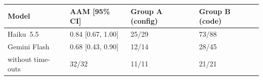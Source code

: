 \begin{tabular}{llll}
\toprule
Model & AAM [95\% CI] & Group A (config) & Group B (code) \\
\midrule
Haiku~5.5 & 0.84 [0.67, 1.00] & 25/29 & 73/88 \\
Gemini Flash & 0.68 [0.43, 0.90] & 12/14 & 28/45 \\
\quad without time-outs & 32/32 & 11/11 & 21/21 \\
\bottomrule
\end{tabular}
